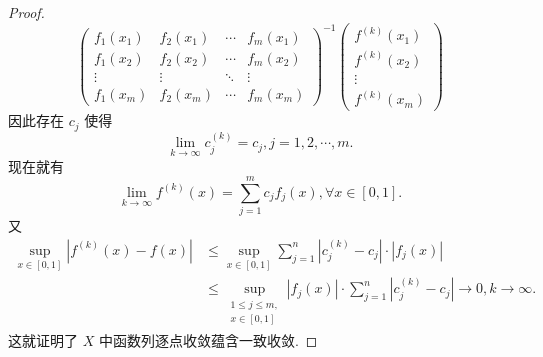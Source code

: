 \documentclass[../../main.tex]{subfiles}%
\begin{document}
\begin{proof}
\[\begin{pmatrix}
f_1(x_1) & f_2(x_1) & \cdots & f_m(x_1) \\
f_1(x_2) & f_2(x_2) & \cdots & f_m(x_2) \\
\vdots & \vdots & \ddots & \vdots \\
f_1(x_m) & f_2(x_m) & \cdots & f_m(x_m)
\end{pmatrix}^{-1}
\begin{pmatrix}
f^{(k)}(x_1) \\
f^{(k)}(x_2) \\
\vdots \\
f^{(k)}(x_m)
\end{pmatrix}
\]
因此存在 \( c_j \) 使得
\[
\lim_{k \to \infty} c_j^{(k)} = c_j, j = 1, 2, \cdots, m.
\]
现在就有
\[
\lim_{k \to \infty} f^{(k)}(x) = \sum_{j=1}^m c_j f_j(x), \forall x \in [0,1].
\]
又
\[
\begin{aligned}
\sup_{x \in [0,1]} \left| f^{(k)}(x) - f(x) \right| &\leqslant \sup_{x \in [0,1]} \sum_{j=1}^n \left| c_j^{(k)} - c_j \right| \cdot \left| f_j(x) \right| \\
&\leqslant \sup_{\substack{1 \leqslant j \leqslant m, \\ x \in [0,1]}} \left| f_j(x) \right| \cdot \sum_{j=1}^n \left| c_j^{(k)} - c_j \right| \to 0, k \to \infty.
\end{aligned}
\]
这就证明了 \( X \) 中函数列逐点收敛蕴含一致收敛.

\end{proof}
\end{document}
